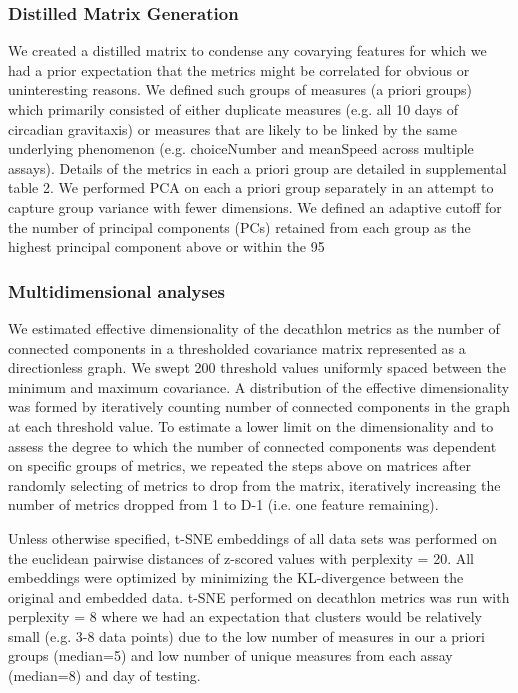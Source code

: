 \documentclass[12pt,letterpaper]{article}
\begin{document}
\subsubsection{Distilled Matrix Generation}

We created a distilled matrix to condense any covarying features for which we had a prior expectation that the metrics might be correlated for obvious or uninteresting reasons. We defined such groups of measures (a priori groups) which primarily consisted of either duplicate measures (e.g. all 10 days of circadian gravitaxis) or measures that are likely to be linked by the same underlying phenomenon (e.g. choiceNumber and meanSpeed across multiple assays). Details of the metrics in each a priori group are detailed in supplemental table 2. We performed PCA on each a priori group separately in an attempt to capture group variance with fewer dimensions. We  defined an adaptive cutoff for the number of principal components (PCs) retained from each group as the highest principal component above or within the 95%

\subsubsection{Multidimensional analyses}

We estimated effective dimensionality of the decathlon metrics as the number of connected components in a thresholded covariance matrix represented as a directionless graph. We swept 200 threshold values uniformly spaced between the minimum and maximum covariance. A distribution of the effective dimensionality was formed by iteratively counting number of connected components in the graph at each threshold value. To estimate a lower limit on the dimensionality and to assess the degree to which the number of connected components was dependent on specific groups of metrics, we repeated the steps above on matrices after randomly selecting of metrics to drop from the matrix, iteratively increasing the number of metrics dropped from 1 to D-1 (i.e. one feature remaining).

Unless otherwise specified, t-SNE embeddings of all data sets was performed on the euclidean pairwise distances of z-scored values with perplexity = 20. All embeddings were optimized by minimizing the KL-divergence between the original and embedded data. t-SNE performed on decathlon metrics was run with perplexity = 8 where we had an expectation that clusters would be relatively small (e.g. 3-8 data points) due to the low number of measures in our a priori groups (median=5) and low number of unique measures from each assay (median=8) and day of testing.
\end{document}
